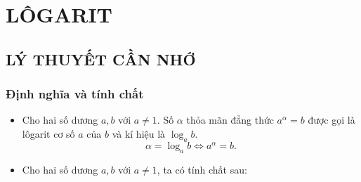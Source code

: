 \section{LÔGARIT}
\subsection{LÝ THUYẾT CẦN NHỚ}
\subsubsection{Định nghĩa và tính chất}
	\begin{itemize}
			\item [\iconMT] Cho hai số dương $a, b$ với $a\neq 1$. Số $\alpha$ thỏa mãn đẳng thức $a^{\alpha}=b$ được gọi là lôgarit cơ số $a$ của $b$ và kí hiệu là $\log_ab$.
			$$\alpha=\log_ab \Leftrightarrow a^{\alpha}=b.$$
			\item [\iconMT] Cho hai số dương $a, b$ với $a\neq 1$, ta có tính chất sau:
			\begin{boxdn}
		\end{boxdn}	
	\end{itemize}

